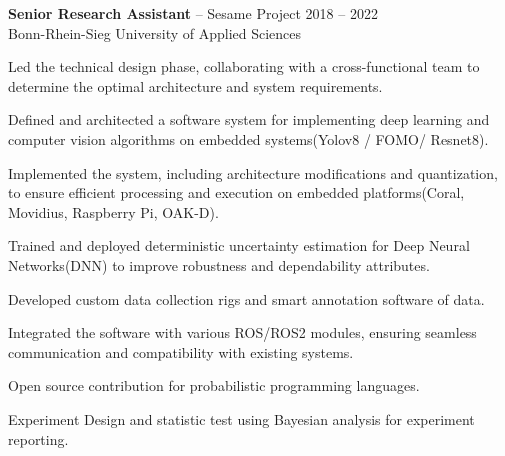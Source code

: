 \documentclass{article}
\newcommand{\employer}[4]{{
\vspace*{2pt}%
\textbf{#1} #2 \hfill #3\\ #4 \vspace*{2pt}}
}
\renewcommand{\labelitemii}{
	\raisebox{0.3ex}{\tiny\textbullet}
}
\newenvironment{bullet-list-minor}{
\begin{list}{\labelitemii}{\setlength\leftmargin{15pt} 
\topsep 0pt \itemsep -2pt}}{\vspace*{4pt}\end{list}
}
\begin{document}
    \employer{Senior Research Assistant}{-- Sesame Project}{2018 -- 2022}
    {Bonn-Rhein-Sieg University of Applied Sciences}
	\begin{bullet-list-minor}
		\item  Led the technical design phase, collaborating with a cross-functional team to determine the optimal architecture and system requirements.
		\item  Defined and architected a software system for implementing deep learning and computer vision algorithms on embedded systems(Yolov8 / FOMO/ Resnet8).
		\item  Implemented the system, including architecture modifications and quantization, to ensure efficient processing and execution on embedded platforms(Coral, Movidius, Raspberry Pi, OAK-D).
		\item  Trained and deployed deterministic uncertainty estimation for Deep Neural Networks(DNN) to improve robustness and dependability attributes.
		\item  Developed custom data collection rigs and smart annotation software of data.
		\item  Integrated the software with various ROS/ROS2 modules, ensuring seamless communication and compatibility with existing systems.
		\item  Open source contribution for probabilistic programming languages.
		\item  Experiment Design and statistic test using Bayesian analysis for experiment reporting.
    \end{bullet-list-minor}
    
\end{document}
